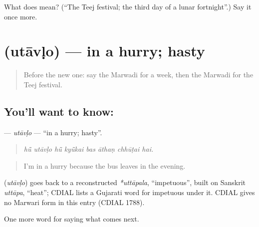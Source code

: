 \begin{tcolorbox}[breakable,colback=teal!4,colframe=teal!35!black,title={Before you move on}]
What does  mean? (\textquotedblleft{}The Teej festival; the third day of a lunar fortnight\textquotedblright{}.) Say it once more.
\end{tcolorbox}
\section[\texorpdfstring{\mw{उतावळो} (utāvḷo)}{उतावळो (utāvḷo)}]{ (utāvḷo) — in a hurry; hasty}

\label{lesson:MW-C219-utavlo}



\begin{quote}
Before the new one: say the Marwadi for a week, then the Marwadi for the Teej festival.
\end{quote}

\subsection*{You'll want to know: }
\textbf{} — \emph{utāvḷo} — \textquotedblleft{}in a hurry; hasty\textquotedblright{}.

\begin{quote}
       
\end{quote}

\begin{quote}
\emph{hū̃ utāvḷo hū̃ kyū̃kai bas āthaṇ chhūṭai hai.}
\end{quote}

\begin{quote}
I'm in a hurry because the bus leaves in the evening.
\end{quote}

\begin{cousinweb}
\textbf{} (\emph{utāvḷo}) goes back to a reconstructed \emph{*uttāpala}, \textquotedblleft{}impetuous\textquotedblright{}, built on Sanskrit \emph{uttāpa}, \textquotedblleft{}heat\textquotedblright{}; CDIAL lists a Gujarati word for impetuous under it. CDIAL gives no Marwari form in this entry (CDIAL 1788).
\end{cousinweb}

\begin{grammarlens}[title={What you've built}]
One more word for saying what comes next.
\end{grammarlens}

